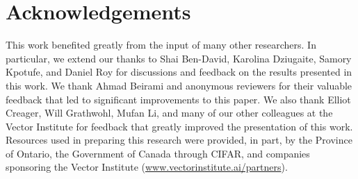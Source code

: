 \section{Acknowledgements}

This work benefited greatly from the input of many other researchers. In particular, we extend our thanks to Shai Ben-David, Karolina Dziugaite, Samory Kpotufe, and Daniel Roy for discussions and feedback on the results presented in this work. We thank Ahmad Beirami and anonymous reviewers for their valuable feedback that led to significant improvements to this paper. We also thank Elliot Creager, Will Grathwohl, Mufan Li, and many of our other colleagues at the Vector Institute for feedback that greatly improved the presentation of this work. Resources used in preparing this research were provided, in part, by the Province of Ontario, the Government of Canada through CIFAR, and companies sponsoring the Vector Institute (\url{www.vectorinstitute.ai/partners}).